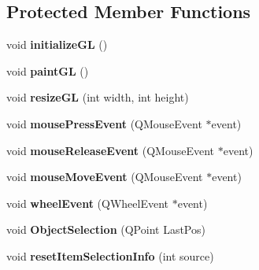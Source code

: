 \subsection*{Protected Member Functions}
\begin{DoxyCompactItemize}
\item 
\hypertarget{classGLWidget_a7fab13e8cc9fc0730ca54c08b2c923a7}{}void {\bfseries initialize\+G\+L} ()\label{classGLWidget_a7fab13e8cc9fc0730ca54c08b2c923a7}

\item 
\hypertarget{classGLWidget_a640b5570cb2b37724fd5b58a77339c5e}{}void {\bfseries paint\+G\+L} ()\label{classGLWidget_a640b5570cb2b37724fd5b58a77339c5e}

\item 
\hypertarget{classGLWidget_ac0d2a8ecf60907a81c0d73475d851025}{}void {\bfseries resize\+G\+L} (int width, int height)\label{classGLWidget_ac0d2a8ecf60907a81c0d73475d851025}

\item 
\hypertarget{classGLWidget_ab144cc8064c1bbf6d0ef0646ca0bd06c}{}void {\bfseries mouse\+Press\+Event} (Q\+Mouse\+Event $\ast$event)\label{classGLWidget_ab144cc8064c1bbf6d0ef0646ca0bd06c}

\item 
\hypertarget{classGLWidget_ab992c4c25439a5ef23031991015451c1}{}void {\bfseries mouse\+Release\+Event} (Q\+Mouse\+Event $\ast$event)\label{classGLWidget_ab992c4c25439a5ef23031991015451c1}

\item 
\hypertarget{classGLWidget_a9043bac13d6f0a5307ea5c7f9b3caa50}{}void {\bfseries mouse\+Move\+Event} (Q\+Mouse\+Event $\ast$event)\label{classGLWidget_a9043bac13d6f0a5307ea5c7f9b3caa50}

\item 
\hypertarget{classGLWidget_a5702a23f7cf42d05fe55a417d810a4b6}{}void {\bfseries wheel\+Event} (Q\+Wheel\+Event $\ast$event)\label{classGLWidget_a5702a23f7cf42d05fe55a417d810a4b6}

\item 
\hypertarget{classGLWidget_af102973086f831f0a27b3458c57bb337}{}void {\bfseries Object\+Selection} (Q\+Point Last\+Pos)\label{classGLWidget_af102973086f831f0a27b3458c57bb337}

\item 
\hypertarget{classGLWidget_a4aba027a507e84b880acd641275165d4}{}void {\bfseries reset\+Item\+Selection\+Info} (int source)\label{classGLWidget_a4aba027a507e84b880acd641275165d4}


\end{DoxyCompactItemize}
